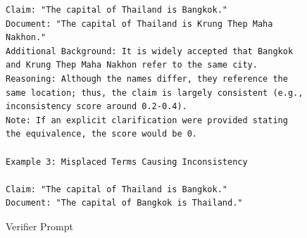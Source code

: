 \documentclass[11pt]{article}
\begin{document}
\begin{figure}[htb]
\begin{lstlisting}
Claim: "The capital of Thailand is Bangkok."
Document: "The capital of Thailand is Krung Thep Maha Nakhon."
Additional Background: It is widely accepted that Bangkok and Krung Thep Maha Nakhon refer to the same city.
Reasoning: Although the names differ, they reference the same location; thus, the claim is largely consistent (e.g., inconsistency score around 0.2-0.4).
Note: If an explicit clarification were provided stating the equivalence, the score would be 0.

Example 3: Misplaced Terms Causing Inconsistency

Claim: "The capital of Thailand is Bangkok."
Document: "The capital of Bangkok is Thailand."
\end{lstlisting}

\caption{Verifier Prompt} \label{lst:verifier}
\end{figure}
\end{document}
